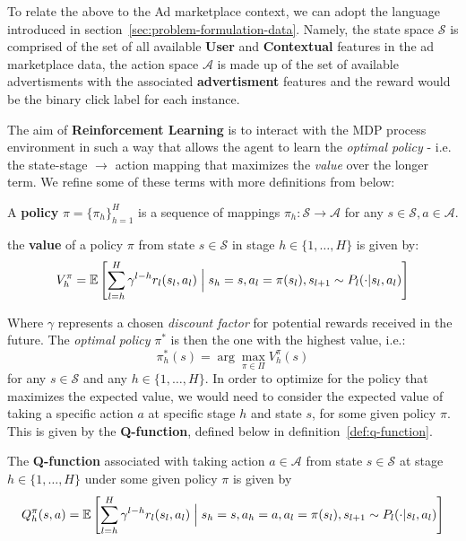 \documentclass{mldsmsc}
\begin{document}
To relate the above to the Ad marketplace context, we can adopt the language introduced in
section~\ref{sec:problem-formulation-data}. Namely, the state space $\mathcal{S}$ is comprised
of the set of all available \textbf{User} and \textbf{Contextual} features in the ad marketplace
data, the action space $\mathcal{A}$ is made up of the set of available advertisments with the
associated \textbf{advertisment} features and the reward would be the binary click label
for each instance.

The aim of \textbf{Reinforcement Learning} is to interact with the MDP process environment in such a way
that allows the agent to learn the \emph{optimal policy} - i.e. the state-stage $\rightarrow$ action mapping
that maximizes the \emph{value} over the longer term. We refine some of these terms with more definitions
from \citep{pike-burke2024LearnigAgents} below:

\begin{definition}\label{def:policy}
    A \textbf{policy} $\pi = \{\pi_h\}_{h=1}^{H}$ is a sequence of mappings $\pi_h : \mathcal{S}
    \rightarrow \mathcal{A}$ for any $s \in \mathcal{S}, a \in \mathcal{A}$.
\end{definition}

\begin{definition}\label{def:policy-value}
    the \textbf{value} of a policy $\pi$ from state $s \in \mathcal{S}$ in stage
    $h \in \{1, \ldots, H\}$ is given by:
    \begin{equation}\label{eqn:value-function}
        V_h^{\pi} = \mathbb{E} \left[ \sum_{l = h}^{H} \gamma^{l-h} r_l (s_l, a_l) \Bigm| s_h = s, a_l = \pi(s_l), s_{l+1} \sim P_l(\cdot | s_l, a_l)\right]
    \end{equation}
\end{definition}

Where $\gamma$ represents a chosen \emph{discount factor} for potential rewards received in the future. 
The \emph{optimal policy} $\pi^*$ is then the one with the highest value, i.e.:
\[
\pi_h^*(s) = \arg\max_{\pi \in \Pi} V_h^{\pi}(s)
\]
for any $s \in \mathcal{S}$ and any $h \in \{1,\ldots, H\}$. In order to optimize for the
policy that maximizes the expected value, we would need to consider the expected
value of taking a specific action $a$ at specific stage $h$ and state $s$, for some given policy $\pi$. This is given
by the \textbf{Q-function}, defined below in definition~\ref{def:q-function}.

\begin{definition}\label{def:q-function}
    The \textbf{Q-function} associated with taking action $a \in \mathcal{A}$ from state
    $s \in \mathcal{S}$ at stage $h \in \{1, \ldots, H\}$ under some given policy $\pi$ is given by
    \begin{equation}\label{eqn:q-function}
        Q_h^{\pi}(s,a) = \mathbb{E} \left[ \sum_{l = h}^{H} \gamma^{l-h} r_l (s_l, a_l) \Bigm| s_h = s, 
        a_h = a, a_l = \pi(s_l), s_{l+1} \sim P_l(\cdot | s_l, a_l)\right]
    \end{equation}
\end{definition}
\end{document}
